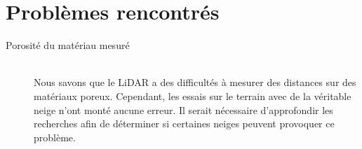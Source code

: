 \section{Problèmes rencontrés}

\begin{description}
    \item[Porosité du matériau mesuré] \hfill \\ 
    Nous savons que le LiDAR a des difficultés à mesurer des distances sur des matériaux poreux. Cependant,
    les essais sur le terrain avec de la véritable neige n'ont monté aucune erreur. Il serait nécessaire
    d'approfondir les recherches afin de déterminer si certaines neiges peuvent provoquer ce problème.
\end{description}
